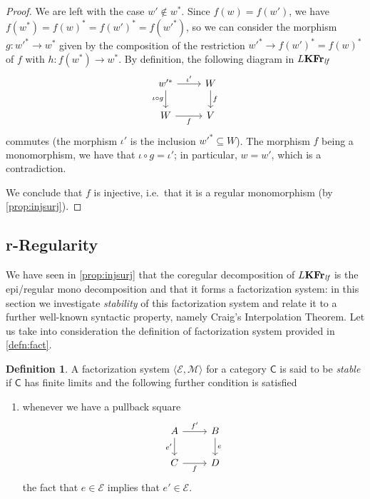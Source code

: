 \documentclass{article}
\newcommand{\blue}[1]{{\color{blue} #1}}
\theoremstyle{definition}
\newtheorem{defn}{Definition}
\newcommand{\KFr}{\textup{\textbf{KFr}}}
\newcommand{\lf}{\textit{lf}}
\begin{document}
\begin{proof}
We are left with the case $w' \not\in w^*$.
Since $f(w) = f(w')$, we have $f(w^*) = f(w)^* = f(w')^* = f(w'^*)$, so we can consider the morphism $g \colon w'^* \longrightarrow w^*$ given by the composition of the restriction $w'^* \longrightarrow f(w')^* = f(w)^*$ of $f$ with $h \colon f(w^*) \longrightarrow w^*$. By definition, the following diagram in $L\KFr_\lf$
\[\begin{tikzcd}
	{w'^*} & W \\
	W & V
	\arrow["{\iota'}", from=1-1, to=1-2]
        \arrow["\iota \circ g"', from=1-1, to=2-1]
	\arrow["f", from=1-2, to=2-2]
	\arrow["f"', from=2-1, to=2-2]
\end{tikzcd}\]
commutes (the morphism $\iota'$ is the inclusion $w'^* \subseteq W$). The morphism $f$ being a monomorphism, we have that 
$\iota \circ g  = \iota'$;
in particular, $w = w'$, which is a contradiction.

We conclude that $f$ is injective, i.e.\ that it is a regular monomorphism (by \cref{prop:injsurj}).
\end{proof}

\subsection{r-Regularity}

We have seen in \cref{prop:injsurj} that the coregular decomposition of $L\KFr_\lf$ is the epi/regular mono decomposition and that it forms a factorization system:
in this section we investigate \emph{stability} of this factorization system and relate it to a further well-known syntactic property, namely Craig's Interpolation Theorem. Let us take into consideration the definition of factorization system provided in \cref{defn:fact}.
\begin{defn}\label{defn:stab}
A factorization system $\langle \mathcal{E},\mathcal{M} \rangle$ for a category $\mathsf{C}$ is said to be \emph{stable} if $\mathsf{C}$ has finite limits and the following further condition is satisfied
 \begin{enumerate}
    \item[\rm (iv)] whenever we have a pullback square
    \[\begin{tikzcd}[ampersand replacement=\&]
	A \& B \\
	C \& D
	\arrow["{f'}", from=1-1, to=1-2]
	\arrow["{e'}"', from=1-1, to=2-1]
	\arrow["e", from=1-2, to=2-2]
	\arrow["f"', from=2-1, to=2-2]
    \end{tikzcd}\]
    the fact that $e \in \mathcal{E}$ implies that $e' \in \mathcal{E}$.
\end{enumerate}
\end{defn}
\end{document}
